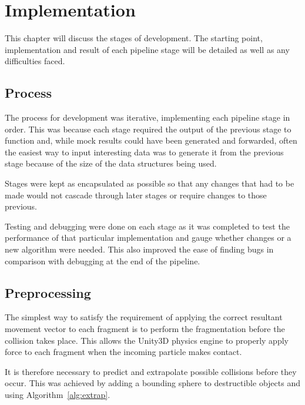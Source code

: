\chapter{Implementation}

This chapter will discuss the stages of development. The starting point, implementation and result of each pipeline stage will be detailed as well as any difficulties faced.

\section{Process}

The process for development was iterative, implementing each pipeline stage in order. This was because each stage required the output of the previous stage to function and, while mock results could have been generated and forwarded, often the easiest way to input interesting data was to generate it from the previous stage because of the size of the data structures being used.

Stages were kept as encapsulated as possible so that any changes that had to be made would not cascade through later stages or require changes to those previous.

Testing and debugging were done on each stage as it was completed to test the performance of that particular implementation and gauge whether changes or a new algorithm were needed. This also improved the ease of finding bugs in comparison with debugging at the end of the pipeline.

\section{Preprocessing}

\label{sect:pre}

The simplest way to satisfy the requirement of applying the correct resultant movement vector to each fragment is to perform the fragmentation before the collision takes place. This allows the Unity3D physics engine to properly apply force to each fragment when the incoming particle makes contact.

It is therefore necessary to predict and extrapolate possible collisions before they occur. This was achieved by adding a bounding sphere to destructible objects and using Algorithm~\ref{alg:extrap}.

